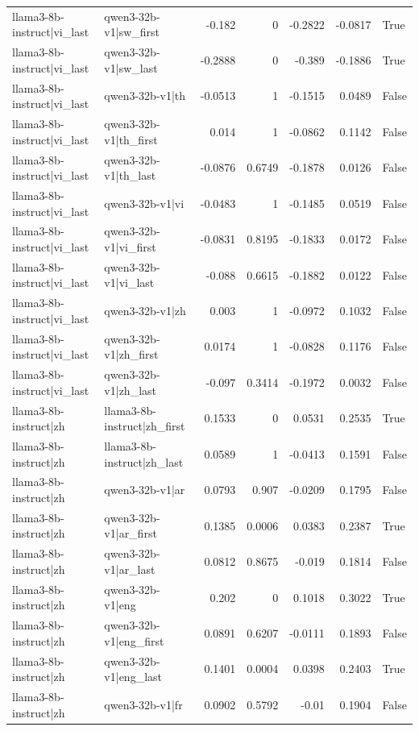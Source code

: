 \begin{table}
\begin{tabular}{l l r r r r l}
llama3-8b-instruct|vi_last & qwen3-32b-v1|sw_first & -0.182 & 0 & -0.2822 & -0.0817 & True \\
llama3-8b-instruct|vi_last & qwen3-32b-v1|sw_last & -0.2888 & 0 & -0.389 & -0.1886 & True \\
llama3-8b-instruct|vi_last & qwen3-32b-v1|th & -0.0513 & 1 & -0.1515 & 0.0489 & False \\
llama3-8b-instruct|vi_last & qwen3-32b-v1|th_first & 0.014 & 1 & -0.0862 & 0.1142 & False \\
llama3-8b-instruct|vi_last & qwen3-32b-v1|th_last & -0.0876 & 0.6749 & -0.1878 & 0.0126 & False \\
llama3-8b-instruct|vi_last & qwen3-32b-v1|vi & -0.0483 & 1 & -0.1485 & 0.0519 & False \\
llama3-8b-instruct|vi_last & qwen3-32b-v1|vi_first & -0.0831 & 0.8195 & -0.1833 & 0.0172 & False \\
llama3-8b-instruct|vi_last & qwen3-32b-v1|vi_last & -0.088 & 0.6615 & -0.1882 & 0.0122 & False \\
llama3-8b-instruct|vi_last & qwen3-32b-v1|zh & 0.003 & 1 & -0.0972 & 0.1032 & False \\
llama3-8b-instruct|vi_last & qwen3-32b-v1|zh_first & 0.0174 & 1 & -0.0828 & 0.1176 & False \\
llama3-8b-instruct|vi_last & qwen3-32b-v1|zh_last & -0.097 & 0.3414 & -0.1972 & 0.0032 & False \\
llama3-8b-instruct|zh & llama3-8b-instruct|zh_first & 0.1533 & 0 & 0.0531 & 0.2535 & True \\
llama3-8b-instruct|zh & llama3-8b-instruct|zh_last & 0.0589 & 1 & -0.0413 & 0.1591 & False \\
llama3-8b-instruct|zh & qwen3-32b-v1|ar & 0.0793 & 0.907 & -0.0209 & 0.1795 & False \\
llama3-8b-instruct|zh & qwen3-32b-v1|ar_first & 0.1385 & 0.0006 & 0.0383 & 0.2387 & True \\
llama3-8b-instruct|zh & qwen3-32b-v1|ar_last & 0.0812 & 0.8675 & -0.019 & 0.1814 & False \\
llama3-8b-instruct|zh & qwen3-32b-v1|eng & 0.202 & 0 & 0.1018 & 0.3022 & True \\
llama3-8b-instruct|zh & qwen3-32b-v1|eng_first & 0.0891 & 0.6207 & -0.0111 & 0.1893 & False \\
llama3-8b-instruct|zh & qwen3-32b-v1|eng_last & 0.1401 & 0.0004 & 0.0398 & 0.2403 & True \\
llama3-8b-instruct|zh & qwen3-32b-v1|fr & 0.0902 & 0.5792 & -0.01 & 0.1904 & False \\

\end{tabular}
\end{table}

